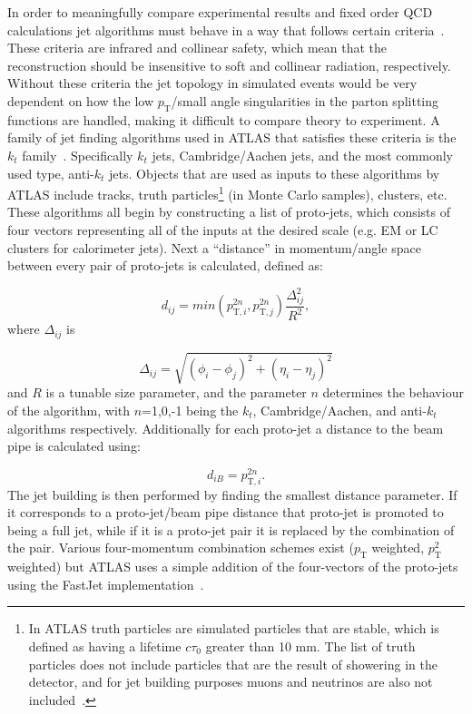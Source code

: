 In order to meaningfully compare experimental results and fixed order QCD calculations jet algorithms must behave in a way that follows certain criteria~\cite{Blazey:2000qt}.  
These criteria are infrared and collinear safety, which mean that the reconstruction should be insensitive to soft and collinear radiation, respectively.  
Without these criteria the jet topology in simulated events would be very dependent on how the low $p_{\mathrm T}$/small angle singularities in the parton splitting functions are handled, making it difficult to compare theory to experiment.  
A family of jet finding algorithms used in ATLAS that satisfies these criteria is the $k_t$ family~\cite{Cacciari:2008gp}.  
Specifically $k_t$ jets, Cambridge/Aachen jets, and the most commonly used type, anti-$k_t$ jets.  
Objects that are used as inputs to these algorithms by ATLAS include tracks, truth particles\footnote{In ATLAS truth particles are simulated particles that are stable, which is defined as having a lifetime $c\tau _{\mathrm 0}$ greater than 10 mm.  The list of truth particles does not include particles that are the result of showering in the detector, and for jet building purposes muons and neutrinos are also not included~\cite{ATL-PHYS-PUB-2015-013}.}  (in Monte Carlo samples), clusters, etc.  
These algorithms all begin by constructing a list of proto-jets, which consists of four vectors representing all of the inputs at the desired scale (e.g. EM or LC clusters for calorimeter jets).  
Next a ``distance'' in momentum/angle space between every pair of proto-jets is calculated, defined as:

\begin{equation}
  d_{ij}=min\left(p_{\mathrm T,i}^{2n}, p_{\mathrm T,j}^{2n}\right)\frac{\Delta_{ij}^2}{R^2}, 
\end{equation}
\noindent
where $\Delta_{ij}$ is  

\begin{equation}
  \Delta_{ij} = \sqrt{ \left(\phi_i-\phi_j\right)^2+\left(\eta_i-\eta_j\right)^2}
\end{equation}
\noindent
and $R$ is a tunable size parameter, and the parameter $n$ determines the behaviour of the algorithm, with $n$=1,0,-1 being the $k_t$, Cambridge/Aachen, and anti-$k_t$ algorithms respectively.  
Additionally for each proto-jet a distance to the beam pipe is calculated using:

\begin{equation}
  d_{iB} = p_{\mathrm T,i}^{2n}.
\end{equation}  
\noindent
The jet building is then performed by finding the smallest distance parameter.  
If it corresponds to a proto-jet/beam pipe distance that proto-jet is promoted to being a full jet, while if it is a proto-jet pair it is replaced by the combination of the pair.  
Various four-momentum combination schemes exist ($p_{\mathrm T}$ weighted, $p_{\mathrm T}^2$ weighted) but ATLAS uses a simple addition of the four-vectors of the proto-jets using the FastJet implementation~\cite{Cacciari:2011ma}.  

